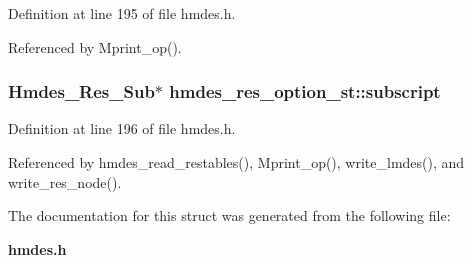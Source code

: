 Definition at line 195 of file hmdes.h.

Referenced by Mprint\_\-op().
\subsubsection{\setlength{\rightskip}{0pt plus 5cm}\bf{Hmdes\_\-Res\_\-Sub}$\ast$ \bf{hmdes\_\-res\_\-option\_\-st::subscript}}\label{structhmdes__res__option__st_cd91a2d2462669fcd7d087011b0fc60c}




Definition at line 196 of file hmdes.h.

Referenced by hmdes\_\-read\_\-restables(), Mprint\_\-op(), write\_\-lmdes(), and write\_\-res\_\-node().

The documentation for this struct was generated from the following file:\begin{CompactItemize}
\item 
\bf{hmdes.h}\end{CompactItemize}
